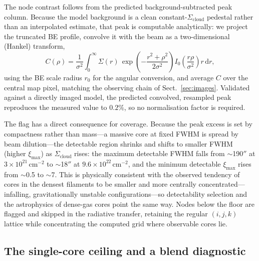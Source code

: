 \documentclass[11pt,a4paper]{article}
\newcommand{\rzero}{r_{0}}
\newcommand{\ximax}{\xi_{\mathrm{max}}}
\newcommand{\Scloud}{\Sigma_{\mathrm{cloud}}}
\begin{document}
The node contrast follows from the predicted background-subtracted peak column.
Because the model background is a clean constant-$\Scloud$ pedestal rather than
an interpolated estimate, that peak is computable analytically: we project the
truncated BE profile, convolve it with the beam as a two-dimensional (Hankel)
transform,
\begin{equation}
  C(\rho) = \frac{1}{\sigma^{2}}\!\int_{0}^{\infty}\!\Sigma(r)\,
  \exp\!\left(-\frac{r^{2}+\rho^{2}}{2\sigma^{2}}\right)
  I_{0}\!\left(\frac{r\rho}{\sigma^{2}}\right) r\,\mathrm{d}r,
  \label{eq:hankel}
\end{equation}
using the BE scale radius $\rzero$ for the angular conversion, and average $C$
over the central map pixel, matching the observing chain of
Sect.~\ref{sec:images}. Validated against a directly imaged model, the
predicted convolved, resampled peak reproduces the measured value to $0.2\%$,
so no normalisation factor is required.

The flag has a direct consequence for coverage. Because the peak excess is set
by compactness rather than mass---a massive core at fixed FWHM is spread by
beam dilution---the detectable region shrinks and shifts to smaller FWHM
(higher $\ximax$) as $\Scloud$ rises: the maximum detectable FWHM falls from
$\sim$190$''$ at $3\times10^{21}\,\mathrm{cm^{-2}}$ to $\sim$18$''$ at
$9.6\times10^{22}\,\mathrm{cm^{-2}}$, and the minimum detectable $\ximax$ rises
from $\sim$0.5 to $\sim$7. This is physically consistent with the observed
tendency of cores in the densest filaments to be smaller and more centrally
concentrated---infalling, gravitationally unstable configurations---so
detectability selection and the astrophysics of dense-gas cores point the same
way. Nodes below the floor are flagged and skipped in the radiative transfer,
retaining the regular $(i,j,k)$ lattice while concentrating the computed grid
where observable cores lie.

\subsection{The single-core ceiling and a blend diagnostic}
\label{sec:ceiling}
\end{document}
